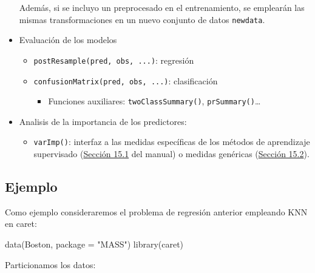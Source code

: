 \documentclass[
]{book}
\newenvironment{Shaded}{\begin{snugshade}}{\end{snugshade}}
\newcommand{\AttributeTok}[1]{\textcolor[rgb]{0.77,0.63,0.00}{#1}}
\newcommand{\ConstantTok}[1]{\textcolor[rgb]{0.00,0.00,0.00}{#1}}
\newcommand{\DecValTok}[1]{\textcolor[rgb]{0.00,0.00,0.81}{#1}}
\newcommand{\FloatTok}[1]{\textcolor[rgb]{0.00,0.00,0.81}{#1}}
\newcommand{\FunctionTok}[1]{\textcolor[rgb]{0.00,0.00,0.00}{#1}}
\newcommand{\NormalTok}[1]{#1}
\newcommand{\OtherTok}[1]{\textcolor[rgb]{0.56,0.35,0.01}{#1}}
\newcommand{\SpecialCharTok}[1]{\textcolor[rgb]{0.00,0.00,0.00}{#1}}
\newcommand{\StringTok}[1]{\textcolor[rgb]{0.31,0.60,0.02}{#1}}
\providecommand{\tightlist}{%
  \setlength{\itemsep}{0pt}\setlength{\parskip}{0pt}}
\theoremstyle{break}
\theoremstyle{definition}
\theoremstyle{definition}
\theoremstyle{definition}
\theoremstyle{definition}
\theoremstyle{remark}
\begin{document}
\begin{itemize}
  Además, si se incluyo un preprocesado en el entrenamiento, se emplearán las mismas transformaciones en un nuevo conjunto de datos \texttt{newdata}.
\item
  Evaluación de los modelos

  \begin{itemize}
  \item
    \texttt{postResample(pred,\ obs,\ ...)}: regresión
  \item
    \texttt{confusionMatrix(pred,\ obs,\ ...)}: clasificación

    \begin{itemize}
    \tightlist
    \item
      Funciones auxiliares: \texttt{twoClassSummary()}, \texttt{prSummary()}\ldots{}
    \end{itemize}
  \end{itemize}
\item
  Analisis de la importancia de los predictores:

  \begin{itemize}
  \tightlist
  \item
    \texttt{varImp()}: interfaz a las medidas específicas de los métodos de aprendizaje supervisado (\href{https://topepo.github.io/caret/variable-importance.html\#model-specific-metrics}{Sección 15.1} del manual) o medidas genéricas (\href{https://topepo.github.io/caret/variable-importance.html\#model-independent-metrics}{Sección 15.2}).
  \end{itemize}
\end{itemize}

\hypertarget{ejemplo}{%
\subsection{Ejemplo}\label{ejemplo}}

Como ejemplo consideraremos el problema de regresión anterior empleando KNN en caret:

\begin{Shaded}
\begin{Highlighting}[]
\FunctionTok{data}\NormalTok{(Boston, }\AttributeTok{package =} \StringTok{"MASS"}\NormalTok{)}
\FunctionTok{library}\NormalTok{(caret)}
\end{Highlighting}
\end{Shaded}

Particionamos los datos:

\begin{Shaded}
\end{Shaded}
\end{document}
